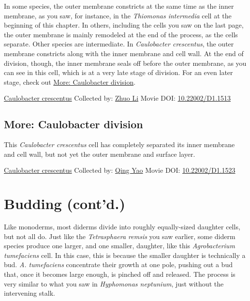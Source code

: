 \documentclass[]{tufte-book}
\begin{document}
In some species, the outer membrane constricts at the same time as the inner membrane, as you saw, for instance, in the \emph{Thiomonas intermedia} cell at the beginning of this chapter. In others, including the cells you saw on the last page, the outer membrane is mainly remodeled at the end of the process, as the cells separate. Other species are intermediate. In \emph{Caulobacter crescentus}, the outer membrane constricts along with the inner membrane and cell wall. At the end of division, though, the inner membrane seals off before the outer membrane, as you can see in this cell, which is at a very late stage of division. For an even later stage, check out \protect\hyperlink{Caulobacter_division}{More: Caulobacter division}.



\hypertarget{htmlwidget-6d3d8c9ee2aaae87bba2}{}

\label{fig:5-7}\protect\hyperlink{tree}{Caulobacter crescentus} Collected by: \protect\hyperlink{zhuo_li}{Zhuo Li} Movie DOI: \href{https://doi.org/10.22002/D1.1513}{10.22002/D1.1513}

\hypertarget{Caulobacter_division}{%
\subsection*{More: Caulobacter division}\label{Caulobacter_division}}

This \emph{Caulobacter crescentus} cell has completely separated its inner membrane and cell wall, but not yet the outer membrane and surface layer.



\hypertarget{htmlwidget-a5a514a960e386fd2295}{}

\label{fig:5-7a}\protect\hyperlink{tree}{Caulobacter crescentus} Collected by: \protect\hyperlink{qing_yao}{Qing Yao} Movie DOI: \href{https://doi.org/10.22002/D1.1523}{10.22002/D1.1523}

\hypertarget{budding-contd.}{%
\section{Budding (cont'd.)}\label{budding-contd.}}

Like monoderms, most diderms divide into roughly equally-sized daughter cells, but not all do. Just like the \emph{Tetrasphaera remsis} you saw earlier, some diderm species produce one larger, and one smaller, daughter, like this \emph{Agrobacterium tumefaciens} cell. In this case, this is because the smaller daughter is technically a bud. \emph{A. tumefaciens} concentrate their growth at one pole, pushing out a bud that, once it becomes large enough, is pinched off and released. The process is very similar to what you saw in \emph{Hyphomonas neptunium}, just without the intervening stalk.
\end{document}
